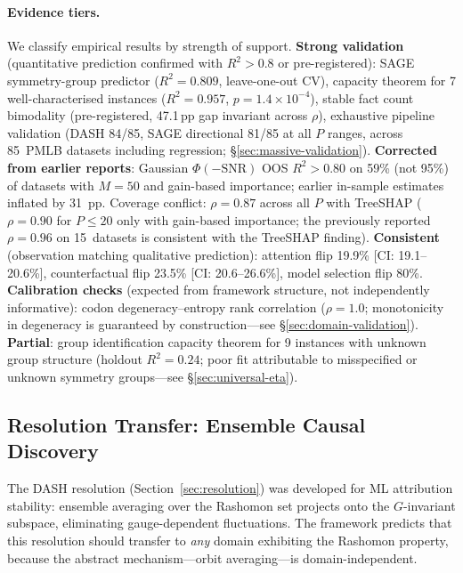 \documentclass[11pt,a4paper]{article}
\begin{document}
\paragraph{Evidence tiers.}
We classify empirical results by strength of support.
\textbf{Strong validation} (quantitative prediction confirmed with $R^2 > 0.8$ or pre-registered): SAGE symmetry-group predictor ($R^2 = 0.809$, leave-one-out CV), capacity theorem for 7 well-characterised instances ($R^2 = 0.957$, $p = 1.4 \times 10^{-4}$), stable fact count bimodality (pre-registered, 47.1\,pp gap invariant across $\rho$), exhaustive pipeline validation (DASH 84/85, SAGE directional 81/85 at all $P$ ranges, across 85~PMLB datasets including regression; \S\ref{sec:massive-validation}).
\textbf{Corrected from earlier reports}: Gaussian $\Phi(-\text{SNR})$ OOS $R^2 > 0.80$ on 59\% (not 95\%) of datasets with $M = 50$ and gain-based importance; earlier in-sample estimates inflated by 31~pp.  Coverage conflict: $\rho = 0.87$ across all $P$ with TreeSHAP ($\rho = 0.90$ for $P \leq 20$ only with gain-based importance; the previously reported $\rho = 0.96$ on 15~datasets is consistent with the TreeSHAP finding).
\textbf{Consistent} (observation matching qualitative prediction): attention flip 19.9\% [CI: 19.1--20.6\%], counterfactual flip 23.5\% [CI: 20.6--26.6\%], model selection flip 80\%.
\textbf{Calibration checks} (expected from framework structure, not independently informative): codon degeneracy--entropy rank correlation ($\rho = 1.0$; monotonicity in degeneracy is guaranteed by construction---see \S\ref{sec:domain-validation}).
\textbf{Partial}: group identification capacity theorem for 9 instances with unknown group structure (holdout $R^2 = 0.24$; poor fit attributable to misspecified or unknown symmetry groups---see \S\ref{sec:universal-eta}).

\subsection{Resolution Transfer: Ensemble Causal Discovery}
\label{sec:ensemble-causal}

The DASH resolution (Section~\ref{sec:resolution}) was developed for ML
attribution stability: ensemble averaging over the Rashomon set projects onto
the $G$-invariant subspace, eliminating gauge-dependent fluctuations.  The
framework predicts that this resolution should transfer to \emph{any} domain
exhibiting the Rashomon property, because the abstract mechanism---orbit
averaging---is domain-independent.
\end{document}
